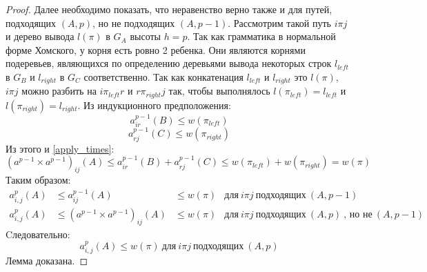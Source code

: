 \documentclass[14pt]{matmex-diploma}
\theoremstyle{definition}
\begin{document}
\begin{proof}
           Далее необходимо показать, что неравенство верно также и для путей, подходящих $(A, p)$, но не подходящих $(A, p-1)$. Рассмотрим такой путь $i\pi j$ и дерево вывода $l(\pi)$ в $G_A$ высоты $h=p$. Так как грамматика в нормальной форме Хомского, у корня есть ровно 2 ребенка. Они являются корнями подеревьев, являющихся по определению деревьями вывода некоторых строк $l_{left}$ в $G_B$ и $l_{right}$ в $G_C$ соответственно. Так как конкатенация $l_{left}$ и $l_{right}$ это $l(\pi)$, $i\pi j$ можно разбить на $i\pi_{left} r$ и $r\pi_{right} j$ так, чтобы выполнялось $l(\pi_{left}) = l_{left}$ и $l(\pi_{right}) = l_{right}$.
            Из индукционного предположения:
            \begin{equation*}
                a^{p-1}_{ir}(B) \le w(\pi_{left})                
            \end{equation*}
            \begin{equation*}
                a^{p-1}_{rj}(C) \le w(\pi_{right})                
            \end{equation*}
            Из этого и \eqref{apply_times}:
            \begin{equation*}
                (a^{p-1}\times a^{p-1})_{ij}(A) \le a^{p-1}_{ir}(B) + a^{p-1}_{rj}(C) \le w(\pi_{left}) + w(\pi_{right}) = w(\pi)
            \end{equation*}
            Таким образом:
            \begin{align*}
                a^p_{i,j}(A) &\le a^{p-1}_{ij}(A)                 &\le w(\pi) & \text{для}~i\pi j~\text{подходящих}~(A, p-1)\\
                a^p_{i,j}(A) &\le (a^{p-1}\times a^{p-1})_{ij}(A) &\le w(\pi) & \text{для}~i\pi j~\text{подходящих}~(A, p)~\text{, но не}~(A, p-1)
            \end{align*}
            Cледовательно:
            \begin{equation*}
                a^p_{i,j}(A) \le w(\pi)~\text{для}~i\pi j~\text{подходящих}~(A, p)
            \end{equation*}
            Лемма доказана.
       \end{proof}        
              
\end{document}
